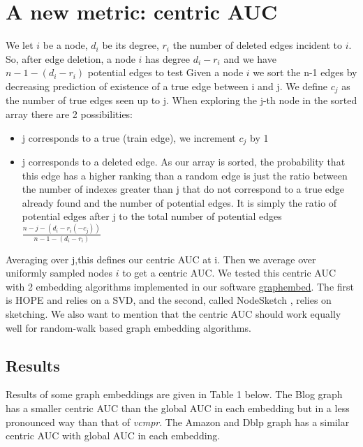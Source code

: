 \documentclass{article}
\begin{document}
\section{A new metric: centric AUC}
We let $i$ be a node, $d_{i}$ be its degree, $r_{i}$ the number of deleted edges incident to $i$.
So, after edge deletion, a node $i$ has degree $d_{i} - r_{i}$ and we have  $ n - 1 - (d_{i} - r_{i})$  potential edges to test
Given a node $i$ we sort the n-1 edges by decreasing prediction of existence of a true edge between i and j.
We define $c_{j}$  as the number of true edges seen up to j.
When exploring the j-th node in the sorted array there are 2 possibilities:
\begin{itemize}
    \item j corresponds to a true (train edge), we increment $c_{j}$ by 1
    \item j corresponds to a deleted edge. As our array is sorted, the probability that this edge has a higher
          ranking than a random edge is just the ratio between the number of indexes greater than j that do not correspond
          to a true edge already found and the number of potential edges. It is simply the ratio of potential edges after j to
          the total number of potential edges $ \frac{n-j-(d_{i}-r_{i}(-c_{j}))}{n-1-(d_{i}-r_{i})}$
\end{itemize}
Averaging over j,this defines our centric AUC at i.  Then we average over uniformly sampled nodes $i$ to get a centric AUC.
We tested this centric AUC with 2 embedding algorithms implemented in our software \href{https://github.com/jean-pierreBoth/graphembed}{\color{blue}graphembed}.
The first is HOPE \citep{Cui} and relies on a SVD, and the second, called NodeSketch \citep{Yang}, relies on sketching. We also want to mention that the centric AUC should work equally well for random-walk based graph embedding algorithms.

\subsection{Results}

Results of some graph embeddings are given in Table 1 below. The Blog graph has a smaller centric AUC than the global AUC in each embedding but in a less pronounced way than that of \textit{vcmpr}. The Amazon and Dblp graph has a similar centric AUC with global AUC in each embedding.
\end{document}
